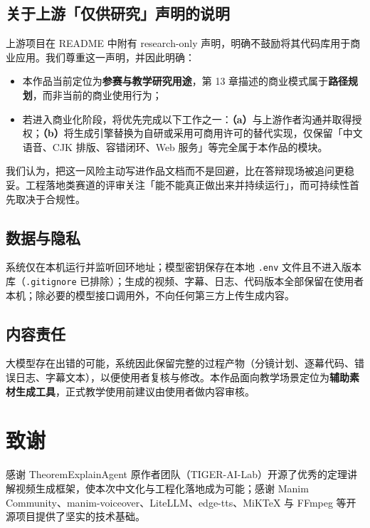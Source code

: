 \documentclass[11pt,a4paper]{ctexart}
\begin{document}
\subsection{关于上游「仅供研究」声明的说明}

上游项目在 README 中附有 research-only 声明，明确不鼓励将其代码库用于商业应用。我们尊重这一声明，并因此明确：

\begin{itemize}
  \item 本作品当前定位为\textbf{参赛与教学研究用途}，第 13 章描述的商业模式属于\textbf{路径规划}，而非当前的商业使用行为；
  \item 若进入商业化阶段，将优先完成以下工作之一：\textbf{（a）}与上游作者沟通并取得授权；\textbf{（b）}将生成引擎替换为自研或采用可商用许可的替代实现，仅保留「中文语音、CJK 排版、容错闭环、Web 服务」等完全属于本作品的模块。
\end{itemize}

\begin{notebox}
我们认为，把这一风险主动写进作品文档而不是回避，比在答辩现场被追问更稳妥。工程落地类赛道的评审关注「能不能真正做出来并持续运行」，而可持续性首先取决于合规性。
\end{notebox}

\subsection{数据与隐私}

系统仅在本机运行并监听回环地址；模型密钥保存在本地 \texttt{.env} 文件且不进入版本库（\texttt{.gitignore} 已排除）；生成的视频、字幕、日志、代码版本全部保留在使用者本机；除必要的模型接口调用外，不向任何第三方上传生成内容。

\subsection{内容责任}

大模型存在出错的可能，系统因此保留完整的过程产物（分镜计划、逐幕代码、错误日志、字幕文本），以便使用者复核与修改。本作品面向教学场景定位为\textbf{辅助素材生成工具}，正式教学使用前建议由使用者做内容审核。

\section*{致谢}

感谢 TheoremExplainAgent 原作者团队（TIGER-AI-Lab）开源了优秀的定理讲解视频生成框架，使本次中文化与工程化落地成为可能；感谢 Manim Community、manim-voiceover、LiteLLM、edge-tts、MiKTeX 与 FFmpeg 等开源项目提供了坚实的技术基础。
\end{document}
